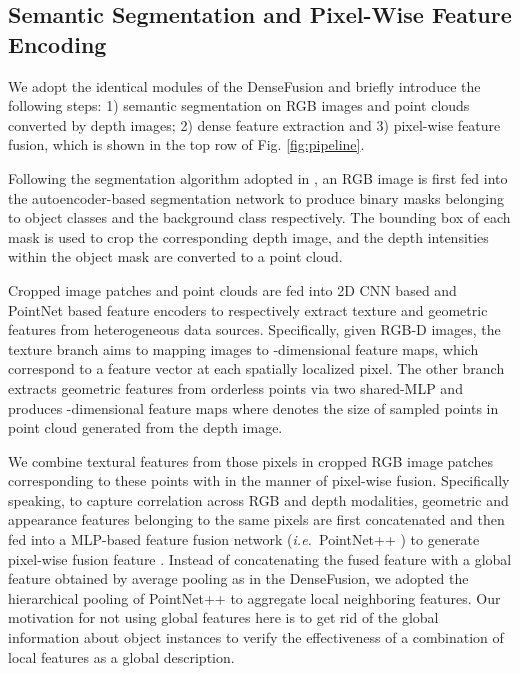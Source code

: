 \documentclass[letterpaper, 10 pt, conference]{ieeeconf}
\def\ie{\emph{i.e.~}} \def\Ie{\emph{I.e.}~}
\begin{document}
\subsection{Semantic Segmentation and Pixel-Wise Feature Encoding}\label{subsec:densefusion}

We adopt the identical modules of the DenseFusion \cite{wang2019densefusion} and briefly introduce the following steps: 1) semantic segmentation on RGB images and point clouds converted by depth images; 2) dense feature extraction and 3) pixel-wise feature fusion, which is shown in the top row of Fig. \ref{fig:pipeline}.

Following the segmentation algorithm adopted in \cite{wang2019densefusion,xiang2017posecnn}, an RGB image is first fed into the autoencoder-based segmentation network to produce  binary masks belonging to  object classes and the background class respectively.  
The bounding box of each mask is used to crop the corresponding depth image, and the depth intensities within the object mask are converted to a point cloud. 

Cropped image patches and point clouds are fed into 2D CNN based and PointNet \cite{qi2017pointnet} based feature encoders to respectively extract texture and geometric features from heterogeneous data sources.
Specifically, given  RGB-D images, the texture branch aims to mapping  images to -dimensional feature maps, which correspond to a feature vector  at each spatially localized pixel.
The other branch extracts geometric features  from orderless points via two shared-MLP and produces -dimensional feature maps where  denotes the size of sampled points in point cloud generated from the depth image.

We combine textural features  from those pixels in cropped RGB image patches corresponding to these  points with  in the manner of pixel-wise fusion.
Specifically speaking, to capture correlation across RGB and depth modalities, geometric and appearance features belonging to the same pixels are first concatenated and then fed into a MLP-based feature fusion network (\ie PointNet++ \cite{qi2017pointnet++}) to generate  pixel-wise fusion feature .
Instead of concatenating the fused feature with a global feature obtained by average pooling as in the DenseFusion\cite{wang2019densefusion}, we adopted the hierarchical pooling of PointNet++ \cite{qi2017pointnet++} to aggregate local neighboring features.
Our motivation for not using global features here is to get rid of the global information about object instances to verify the effectiveness of a combination of local features as a global description.
\end{document}

